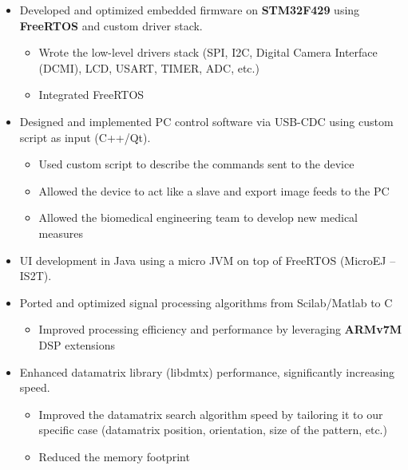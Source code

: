 \documentclass[10pt,a4paper]{altacv}
\begin{document}
\begin{paracol}{2}
\begin{itemize}
\item Developed and optimized embedded firmware on \textbf{\textcolor{bold}{STM32F429}} using \textbf{\textcolor{bold}{FreeRTOS}} and custom driver stack.
\begin{itemize}
    \renewcommand{\labelitemii}{-} %
    \item Wrote the low-level drivers stack (SPI, I2C, Digital Camera Interface (DCMI), LCD, USART, TIMER, ADC, etc.)
    \item Integrated FreeRTOS
\end{itemize}
\item Designed and implemented PC control software via USB-CDC using custom script as input (C++/Qt).
\begin{itemize}
    \renewcommand{\labelitemii}{-} %
    \item Used custom script to describe the commands sent to the device
    \item Allowed the device to act like a slave and export image feeds to the PC
    \item Allowed the biomedical engineering team to develop new medical measures
\end{itemize}
\item UI development in Java using a micro JVM on top of FreeRTOS (MicroEJ – IS2T).
\item Ported and optimized signal processing algorithms from Scilab/Matlab to C
\begin{itemize}
    \renewcommand{\labelitemii}{-} %
    \item Improved processing efficiency and performance by leveraging \textbf{\textcolor{bold}{ARMv7M}} DSP extensions
\end{itemize}
\item Enhanced datamatrix library (libdmtx) performance, significantly increasing speed.
\begin{itemize}
    \renewcommand{\labelitemii}{-} %
    \item Improved the datamatrix search algorithm speed by tailoring it to our specific case (datamatrix position, orientation, size of the pattern, etc.)
    \item Reduced the memory footprint
\end{itemize}
\end{itemize}


\end{paracol}
\end{document}
